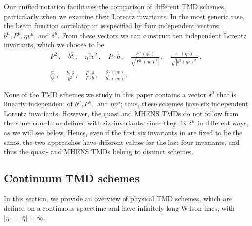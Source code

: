 \documentclass[11pt,a4paper]{article}
\newcommand{\nn}{\nonumber}
\begin{document}
Our unified notation facilitates the comparison of different TMD schemes,
particularly when we examine their Lorentz invariants.
In the most generic case, the beam function correlator in  is specified by
four independent vectors: $b^\mu, P^\mu, \eta v^\mu$, and $\delta^\mu$.
From these vectors we can construct ten independent Lorentz invariants, which we choose to be
\begin{align} \label{eq:lorentz_invariants}
 &P^2 \,,\quad
 b^2 \,,\quad
 \eta^2 v^2 \,,\quad
 P \cdot b \,,\quad
 \frac{P \cdot (\eta v)}{\sqrt{P^2 |(\eta v)^2|}} \,,\quad
 \frac{b \cdot (\eta v)}{\sqrt{|b^2 (\eta v)^2|}} \,,\quad
 \nn\\&
 \frac{\delta^2}{b^2} \,,\quad
 \frac{b \cdot \delta}{b^2} \,,\quad
 \frac{P \cdot \delta}{P \cdot b} \,,\quad
 \frac{\delta \cdot (\eta v)}{b \cdot (\eta v)}
\,.\end{align}

None of the TMD schemes we study in this paper contains a vector $\delta^\mu$ that is linearly independent of $b^\mu, P^\mu,$ and $\eta v^\mu$; thus, these schemes have six independent Lorentz invariants. 
However, the quasi and MHENS TMDs do not follow from the same correlator defined with six invariants, since they fix $\delta^\mu$ in different ways, as we will see below. Hence, even if the first six invariants in  are fixed to be the same, the two approaches have different values for the last four invariants, and thus the quasi- and MHENS TMDs belong to distinct schemes.

\subsection{Continuum TMD schemes}
\label{sec:continuum_tmds}

In this section, we provide an overview of physical TMD schemes, which are defined on a continuous spacetime and have infinitely long Wilson lines, with $|\eta| = |\bar{\eta}| =\infty$.
\end{document}

